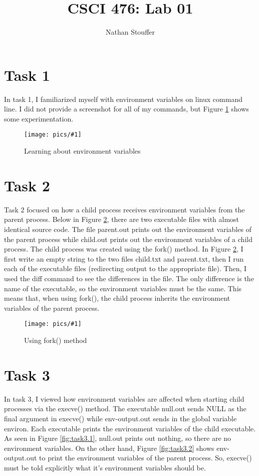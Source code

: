 \documentclass[11pt]{article}
\newcommand{\fig}[2]{ 
\begin{figure}[h]
	\centering
	\caption{#2}
	\texttt{[image: pics/\#1]}
	\label{fig:#1}
\end{figure} 
}
\begin{document}
\title{CSCI 476: Lab 01}
\author{Nathan Stouffer}
\maketitle
\newpage

\section*{Task 1}

In task 1, I familiarized myself with environment variables on linux command line. I did not provide a screenshot for all of my commands, but Figure \ref{fig:task1} shows some experimentation.

\fig{task1}{Learning about environment variables}

\newpage

\section*{Task 2}

Task 2 focused on how a child process receives environment variables from the parent process. Below in Figure \ref{fig:task2}, there are two executable files with almost identical source code. 
The file parent.out prints out the environment variables of the parent process while child.out prints out the environment variables of a child process. The child process was created using the fork() method. 
In Figure \ref{fig:task2}, I first write an empty string to the two files child.txt and parent.txt, then I run each of the executable files (redirecting output to the appropriate file). Then, I used the diff command to see the differences in the file. 
The only difference is the name of the executable, so the environment variables must be the same. 
This means that, when using fork(), the child process inherits the environment variables of the parent process.

\fig{task2}{Using fork() method}

\newpage

\section*{Task 3}

In task 3, I viewed how environment variables are affected when starting child processes via the execve() method.
The executable null.out sends NULL as the final argument in execve() while env-output.out sends in the global variable environ. 
Each executable prints the environment variables of the child executable.
As seen in Figure \ref{fig:task3.1}, null.out prints out nothing, so there are no environment variables. 
On the other hand, Figure \ref{fig:task3.2} shows env-output.out to print the environment variables of the parent process.
So, execve() must be told explicitly what it's environment variables should be.
\end{document}
